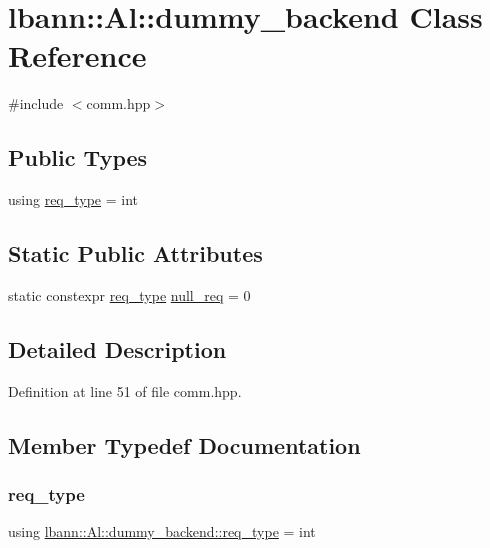 \hypertarget{classlbann_1_1Al_1_1dummy__backend}{}\section{lbann\+:\+:Al\+:\+:dummy\+\_\+backend Class Reference}
\label{classlbann_1_1Al_1_1dummy__backend}


{\ttfamily \#include $<$comm.\+hpp$>$}

\subsection*{Public Types}
\begin{DoxyCompactItemize}
\item 
using \hyperlink{classlbann_1_1Al_1_1dummy__backend_a9386c505d856d41c37d23e4293c11f2f}{req\+\_\+type} = int
\end{DoxyCompactItemize}
\subsection*{Static Public Attributes}
\begin{DoxyCompactItemize}
\item 
static constexpr \hyperlink{classlbann_1_1Al_1_1dummy__backend_a9386c505d856d41c37d23e4293c11f2f}{req\+\_\+type} \hyperlink{classlbann_1_1Al_1_1dummy__backend_a458ac4eb9f62b06984b4ef1b1eeb5851}{null\+\_\+req} = 0
\end{DoxyCompactItemize}


\subsection{Detailed Description}


Definition at line 51 of file comm.\+hpp.



\subsection{Member Typedef Documentation}
\mbox{\label{classlbann_1_1Al_1_1dummy__backend_a9386c505d856d41c37d23e4293c11f2f}} 
\subsubsection{\texorpdfstring{req\+\_\+type}{req\_type}}
{\footnotesize\ttfamily using \hyperlink{classlbann_1_1Al_1_1dummy__backend_a9386c505d856d41c37d23e4293c11f2f}{lbann\+::\+Al\+::dummy\+\_\+backend\+::req\+\_\+type} =  int}



